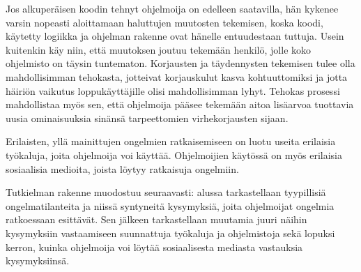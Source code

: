\documentclass[finnish]{tktltiki2}
\theoremstyle{definition}
\theoremstyle{remark}
\begin{document}
Jos alkuperäisen koodin tehnyt ohjelmoija on edelleen saatavilla, hän kykenee varsin nopeasti aloittamaan haluttujen muutosten tekemisen, koska koodi, käytetty logiikka ja ohjelman rakenne ovat hänelle entuudestaan tuttuja. Usein kuitenkin käy niin, että muutoksen joutuu tekemään henkilö, jolle koko ohjelmisto on täysin tuntematon.
Korjausten ja täydennysten tekemisen tulee olla mahdollisimman tehokasta, jotteivat korjauskulut kasva kohtuuttomiksi ja jotta häiriön vaikutus loppukäyttäjille olisi mahdollisimman lyhyt. Tehokas prosessi mahdollistaa myös sen, että ohjelmoija pääsee tekemään aitoa lisäarvoa tuottavia uusia ominaisuuksia sinänsä tarpeettomien virhekorjausten sijaan.



Erilaisten, yllä mainittujen ongelmien ratkaisemiseen on luotu useita erilaisia työkaluja, joita ohjelmoija voi käyttää. Ohjelmoijien käytössä on myös erilaisia sosiaalisia medioita, joista löytyy ratkaisuja ongelmiin.

Tutkielman rakenne muodostuu seuraavasti: alussa tarkastellaan tyypillisiä ongelmatilanteita ja niissä syntyneitä kysymyksiä, joita ohjelmoijat ongelmia ratkoessaan esittävät. Sen jälkeen tarkastellaan muutamia juuri näihin kysymyksiin vastaamiseen suunnattuja työkaluja ja ohjelmistoja sekä lopuksi kerron, kuinka ohjelmoija voi löytää sosiaalisesta mediasta vastauksia kysymyksiinsä.
\end{document}
